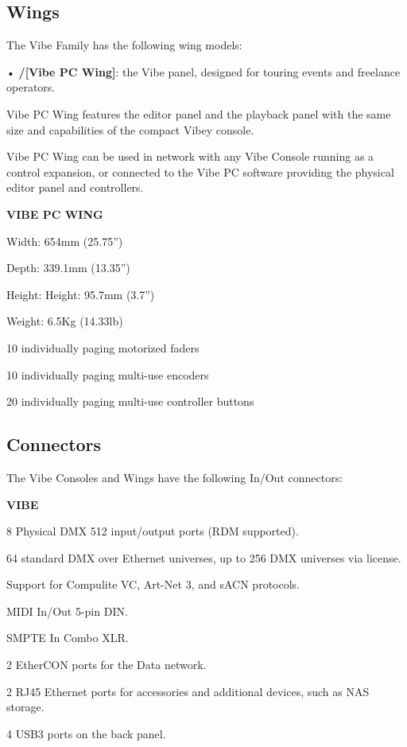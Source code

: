 \documentclass[
]{article}
\begin{document}
\hypertarget{Wings-2.2}{%
\subsection{Wings}\label{Wings-2.2}}

The Vibe Family has the following wing models:

• \textbf{/{[}Vibe PC Wing{]}}: the Vibe panel, designed for touring events and freelance operators.

Vibe PC Wing features the editor panel and the playback panel with the same size and capabilities of the compact Vibey console.

Vibe PC Wing can be used in network with any Vibe Console running as a control expansion, or connected to the Vibe PC software providing the physical editor panel and controllers.

\textbf{VIBE PC WING}

Width: 654mm (25.75'')

Depth: 339.1mm (13.35'')

Height: Height: 95.7mm (3.7'')

Weight: 6.5Kg (14.33lb)

10 individually paging motorized faders

10 individually paging multi-use encoders

20 individually paging multi-use controller buttons

\hypertarget{Connectors-2.3}{%
\subsection{Connectors}\label{Connectors-2.3}}

The Vibe Consoles and Wings have the following In/Out connectors:

\textbf{VIBE}

8 Physical DMX 512 input/output ports (RDM supported).

64 standard DMX over Ethernet universes, up to 256 DMX universes via license.

Support for Compulite VC, Art-Net 3, and sACN protocols.

MIDI In/Out 5-pin DIN.

SMPTE In Combo XLR.

2 EtherCON ports for the Data network.

2 RJ45 Ethernet ports for accessories and additional devices, such as NAS storage.

4 USB3 ports on the back panel.
\end{document}

